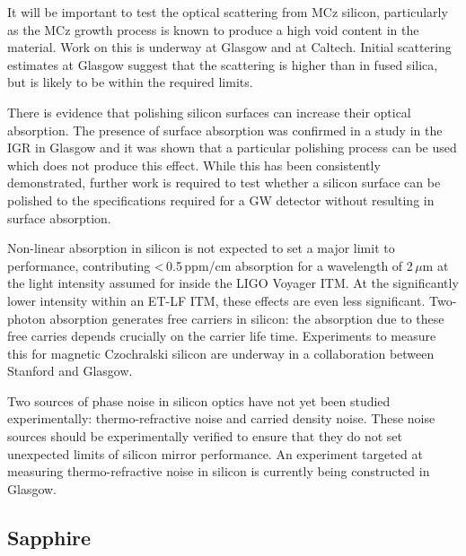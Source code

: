 It will be important to test the optical scattering from MCz silicon, particularly as the MCz growth process is known to produce a high void content in the material. Work on this is underway at Glasgow and at Caltech. Initial scattering estimates at Glasgow suggest that the scattering is higher than in fused silica, but is likely to be within the required limits.

There is evidence that polishing silicon surfaces can increase their optical absorption. The presence of surface absorption was confirmed in a study in the IGR in Glasgow  and it was shown that a particular polishing process can be used which does not produce this effect. While this has been consistently demonstrated, further work is required to test whether a silicon surface can be polished to the specifications required for a GW detector without resulting in surface absorption.

Non-linear absorption in silicon is not expected to set a major limit to performance, contributing <\,0.5\,ppm/cm absorption for a wavelength of 2\,$\mu$m at the light intensity assumed for inside the LIGO Voyager ITM. At the significantly lower intensity within an ET-LF ITM, these effects are even less significant. Two-photon absorption generates free carriers in silicon: the absorption due to these free carries depends crucially on the carrier life time. Experiments to measure this for magnetic Czochralski silicon are underway in a collaboration between Stanford and Glasgow.

Two sources of phase noise in silicon optics have not yet been studied experimentally: thermo-refractive noise and carried density noise. These noise sources should be experimentally verified to ensure that they do not set unexpected limits of silicon mirror performance. An experiment targeted at measuring thermo-refractive noise in silicon is currently being constructed in Glasgow.

\subsection{Sapphire}

